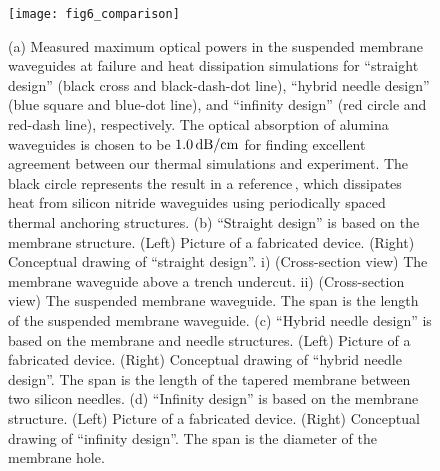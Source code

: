 \documentclass{osa-article}
\begin{document}
\begin{figure}[b!]
\centering\texttt{[image: fig6\_comparison]}
\caption{(a) Measured maximum optical powers in the suspended membrane waveguides at failure and heat dissipation simulations for ``straight design'' (black cross and black-dash-dot line),  ``hybrid needle design'' (blue square and blue-dot line), and ``infinity design'' (red circle and red-dash line), respectively. The optical absorption of alumina waveguides is chosen to be $1.0 \,\rm{dB/cm}$ for finding excellent agreement between our thermal simulations and experiment. The black circle represents the result in a reference\,\cite{Kimble20}, which dissipates heat from silicon nitride waveguides using periodically spaced thermal anchoring structures. (b)  ``Straight design'' is based on the membrane structure. (Left) Picture of a fabricated device. (Right) Conceptual drawing of ``straight design''. i) (Cross-section view) The membrane waveguide above a trench undercut. ii) (Cross-section view) The suspended membrane waveguide. The span is the length of the suspended membrane waveguide.  (c) ``Hybrid needle design'' is based on the membrane and needle structures. (Left) Picture of a fabricated device. (Right) Conceptual drawing of ``hybrid needle design''. The span is the length of the tapered membrane between two silicon needles. (d) ``Infinity design'' is based on the membrane structure. (Left) Picture of a fabricated device. (Right) Conceptual drawing of ``infinity design''. The span is the diameter of the membrane hole.}
\label{fig_6}
\end{figure}
\end{document}
